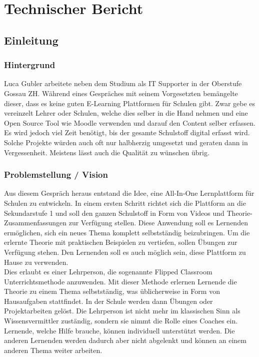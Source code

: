 \section{Technischer Bericht}
\subsection{Einleitung}

\subsubsection{Hintergrund}
Luca Gubler arbeitete neben dem Studium als IT Supporter in der Oberstufe Gossau ZH. Während eines Gespräches mit seinem Vorgesetzten bemängelte dieser, dass es keine guten E-Learning Plattformen für Schulen gibt. Zwar gebe es vereinzelt Lehrer oder Schulen, welche dies selber in die Hand nehmen und eine Open Source Tool wie Moodle verwenden und darauf den Content selber erfassen. Es wird jedoch viel Zeit benötigt, bis der gesamte Schulstoff digital erfasst wird. Solche Projekte würden auch oft nur halbherzig umgesetzt und geraten dann in Vergessenheit. Meistens lässt auch die Qualität zu wünschen übrig.

\subsubsection{Problemstellung / Vision}
Aus diesem Gespräch heraus entstand die Idee, eine All-In-One Lernplattform für Schulen zu entwickeln. In einem ersten Schritt richtet sich die Plattform an die Sekundarstufe 1 und soll den ganzen Schulstoff in Form von Videos und Theorie-Zusammenfassungen zur Verfügung stellen. Diese Anwendung soll es Lernenden ermöglichen, sich ein neues Thema komplett selbstständig beizubringen. Um die erlernte Theorie mit praktischen Beispielen zu vertiefen, sollen Übungen zur Verfügung stehen. Den Lernenden soll es auch möglich sein, diese Plattform zu Hause zu verwenden. \\

Dies erlaubt es einer Lehrperson, die sogenannte Flipped Classroom Unterrichtsmethode anzuwenden. Mit dieser Methode erlernen Lernende die Theorie zu einem Thema selbstständig, was üblicherweise in Form von Hausaufgaben stattfindet. In der Schule werden dann Übungen oder Projektarbeiten gelöst. Die Lehrperson ist nicht mehr im klassischen Sinn als Wissensvermittler zuständig, sondern sie nimmt die Rolle eines Coaches ein. Lernende, welche Hilfe brauche, können individuell unterstützt werden. Die anderen Lernenden werden dadurch aber nicht abgelenkt und können an einem anderen Thema weiter arbeiten. \\

